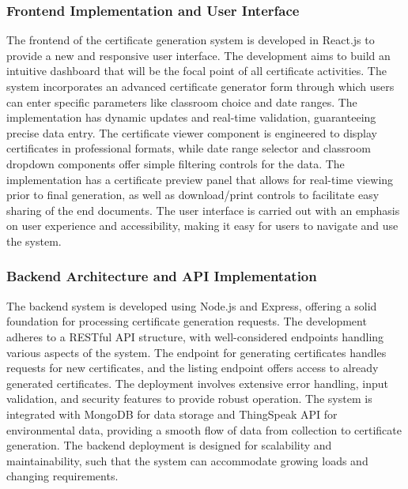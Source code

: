 \subsubsection{Frontend Implementation and User Interface}
The frontend of the certificate generation system is developed in React.js to provide a new and responsive user interface. The development aims to build an intuitive dashboard that will be the focal point of all certificate activities. The system incorporates an advanced certificate generator form through which users can enter specific parameters like classroom choice and date ranges. The implementation has dynamic updates and real-time validation, guaranteeing precise data entry. The certificate viewer component is engineered to display certificates in professional formats, while date range selector and classroom dropdown components offer simple filtering controls for the data. The implementation has a certificate preview panel that allows for real-time viewing prior to final generation, as well as download/print controls to facilitate easy sharing of the end documents. The user interface is carried out with an emphasis on user experience and accessibility, making it easy for users to navigate and use the system.

\subsubsection{Backend Architecture and API Implementation}
The backend system is developed using Node.js and Express, offering a solid foundation for processing certificate generation requests. The development adheres to a RESTful API structure, with well-considered endpoints handling various aspects of the system. The endpoint for generating certificates handles requests for new certificates, and the listing endpoint offers access to already generated certificates. The deployment involves extensive error handling, input validation, and security features to provide robust operation. The system is integrated with MongoDB for data storage and ThingSpeak API for environmental data, providing a smooth flow of data from collection to certificate generation. The backend deployment is designed for scalability and maintainability, such that the system can accommodate growing loads and changing requirements.
